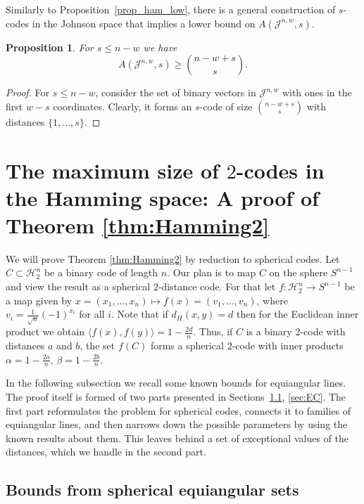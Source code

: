 \documentclass{amsart}
\newtheorem{propositionenv}[definitionenv]{Proposition}
\newenvironment{proposition}{\begin{propositionenv}\rm}{\end{propositionenv}}
\newcommand{\cH}{\mathcal{H}}
\newcommand{\cJ}{\mathcal{J}}
\begin{document}
Similarly to Proposition~\ref{prop_ham_low}, there is a general construction of $s$-codes in the Johnson space that implies a lower bound on $A(\cJ^{n, w}, s)$.
\begin{proposition}\cite{EKR61} 
\label{prop:MN_J2}
For $s \leq n-w$ we have
\begin{equation*}
    A(\cJ^{n, w}, s) \geq \binom{n-w+s}{s}.
\end{equation*}
\end{proposition}
\begin{proof}
For $s \leq n-w$,  consider the set of binary vectors in $\cJ^{n,w}$ with ones in the first $w-s$ coordinates. 
Clearly, it forms an $s$-code of size $\binom{n-w+s}{s}$ with distances $\{1,\dots,s\}$.
\end{proof}

\section{The maximum size of \texorpdfstring{$2$}--codes in the Hamming space: A proof of Theorem \ref{thm:Hamming2}}
We will prove Theorem \ref{thm:Hamming2} by reduction to spherical codes.
Let $C\subset \cH_2^n$ be a binary code of length $n.$ Our plan is to map $C$ on the sphere $S^{n-1}$ and view the result as a spherical $2$-distance code. 
For that let $f:\cH_2^n\to S^{n-1}$ be a map given by $x = (x_{1}, \dots, x_{n}) \mapsto f(x) = (v_{1}, \dots, v_{n})$, where $v_{i} = \frac{1}{\sqrt{n}}(-1)^{x_{i}}$ for all $i$. Note that if $d_H(x,y)=d$ then for the Euclidean inner product we obtain
$\langle f(x), f(y) \rangle=1-\frac{2d}{n}$. Thus, if $C$ is a binary 2-code with distances $a$ and $b$, the set $f(C)$ forms 
a spherical $2$-code with inner products $\alpha = 1-\frac{2a}{n}$, $\beta = 1-\frac{2b}{n}$.

In the following subsection we recall some known bounds for equiangular lines. The proof itself is formed of two parts presented in Sections~\ref{sec:EL}, \ref{sec:EC}. The first part reformulates the problem for spherical codes,
connects it to families of equiangular lines, and then narrows down the possible parameters by using the known results about them. This leaves behind a set of exceptional values of the distances, which we handle in the second part. 

\subsection{Bounds from spherical equiangular sets} \label{sec:EL}
\end{document}
